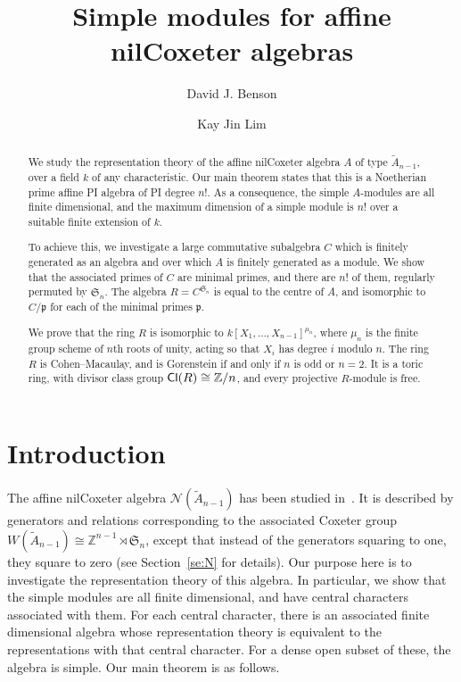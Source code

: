 \documentclass[12pt]{amsart}
\title[Affine nilCoxeter algebras]{Simple modules for affine nilCoxeter algebras}
\author{David J. Benson}
\author{Kay Jin Lim}
\newcommand{\Cl}{\operatorname{\sf Cl}}
\newcommand{\sym}[1]{\mathfrak{S}_{#1}}
\newcommand{\bZ}{{\mathbb{Z}}}
\newcommand{\mcN}{\mathcal{N}}
\newcommand{\mfp}{\mathfrak{p}}
\numberwithin{equation}{section}
\theoremstyle{definition}
\begin{document}
\begin{abstract}
We study the representation theory of the affine nilCoxeter algebra
$A$ of type $\tilde A_{n-1}$, over a field $k$ of any characteristic. 
Our main theorem states that this is a
Noetherian prime affine PI algebra of PI degree $n!$. As a
consequence, the simple $A$-modules are all finite dimensional, and
the maximum dimension of a simple module is $n!$ over a suitable
finite extension of $k$.

To achieve this, we
investigate a large commutative subalgebra $C$ which is finitely
generated as an algebra and over which $A$ is finitely generated as a
module. We
show that the associated primes of $C$ are minimal primes, and there
are $n!$ of them, regularly permuted by $\sym{n}$. The algebra
$R=C^{\sym{n}}$ is equal to the centre of $A$, and isomorphic to $C/\mfp$ for each of the
minimal primes $\mfp$. 

We prove that the ring $R$ is isomorphic to
$k[X_1,\dots,X_{n-1}]^{\mu_n}$, where $\mu_n$ is the finite group
scheme of $n$th roots of unity, acting so that $X_i$ has degree $i$
modulo $n$. The ring $R$ is Cohen--Macaulay,
and is Gorenstein if and only if $n$ is odd or $n=2$. It is a toric ring, with
divisor class group $\Cl(R)\cong\bZ/n$, and every projective
$R$-module is free. 
\end{abstract}



\maketitle

\section{Introduction}

The affine nilCoxeter algebra $\mcN(\tilde A_{n-1})$ has been studied
in~\cite{Bandlow/Schilling/Zabrocki:2011a,
Berg/Bergeron/Pon/Zabrocki:2012a,
Berg/Bergeron/Thomas/Zabrocki:2012a,
Berg/Saliola/Serrano:2014a,
Lam:2006a,
Lam:2008a,
Lee:2017a}. 
It is described by generators and relations
corresponding to the associated Coxeter group $W(\tilde
A_{n-1})\cong\bZ^{n-1}\rtimes\sym{n}$, except that instead of the
generators squaring to one, they square to zero (see
Section~\ref{se:N} for details). Our purpose here is to investigate the
representation theory of this algebra. In particular, we show that
the simple modules are all finite dimensional, and have central
characters associated with them. For each central character, there is
an associated finite dimensional algebra whose representation theory
is equivalent to the representations with that central character. For
a dense open subset of these, the algebra is simple.
Our main theorem is as follows.
\end{document}
